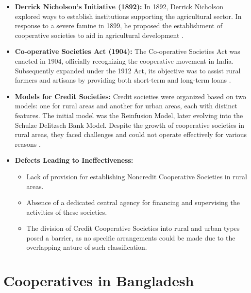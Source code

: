 \begin{itemize}
    \item \textbf{Derrick Nicholson's Initiative (1892):} In 1892, Derrick Nicholson explored ways to establish institutions supporting the agricultural sector. In response to a severe famine in 1899, he proposed the establishment of cooperative societies to aid in agricultural development \cite{PreserveArticles}.
    
    \item \textbf{Co-operative Societies Act (1904):} The Co-operative Societies Act was enacted in 1904, officially recognizing the cooperative movement in India. Subsequently expanded under the 1912 Act, its objective was to assist rural farmers and artisans by providing both short-term and long-term loans \cite{PunjabRevenue}.
    
    \item \textbf{Models for Credit Societies:} Credit societies were organized based on two models: one for rural areas and another for urban areas, each with distinct features. The initial model was the Reinfusion Model, later evolving into the Schulze Delitzsch Bank Model. Despite the growth of cooperative societies in rural areas, they faced challenges and could not operate effectively for various reasons \cite{NCUA}.
    
    \item \textbf{Defects Leading to Ineffectiveness:}
    \begin{itemize}
        \item Lack of provision for establishing Noncredit Cooperative Societies in rural areas.
        \item Absence of a dedicated central agency for financing and supervising the activities of these societies.
        \item The division of Credit Cooperative Societies into rural and urban types posed a barrier, as no specific arrangements could be made due to the overlapping nature of such classification.
    \end{itemize}
\end{itemize}


\section{Cooperatives in Bangladesh}

